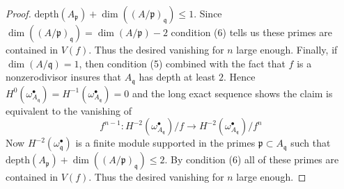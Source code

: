 \begin{proof}
$\text{depth}(A_\mathfrak p) + \dim((A/\mathfrak p)_\mathfrak q) \leq 1$.
Since $\dim((A/\mathfrak p)_\mathfrak q) = \dim(A/\mathfrak p) - 2$
condition (6) tells us these primes are contained in $V(f)$.
Thus the desired vanishing for $n$ large enough.
Finally, if $\dim(A/\mathfrak q) = 1$, then condition (5) combined
with the fact that $f$ is a nonzerodivisor
insures that $A_\mathfrak q$ has depth at least $2$. Hence
$H^0(\omega_{A_\mathfrak q}^\bullet) =
H^{-1}(\omega_{A_\mathfrak q}^\bullet) = 0$
and the long exact sequence shows the claim is
equivalent to the vanishing of
$$
f^{n - 1} :
H^{-2}(\omega_{A_\mathfrak q}^\bullet)/f \to
H^{-2}(\omega_{A_\mathfrak q}^\bullet)/f^n
$$
Now $H^{-2}(\omega^\bullet_\mathfrak q)$ is a finite
module supported in the primes $\mathfrak p \subset A_\mathfrak q$
such that $\text{depth}(A_\mathfrak p) + \dim((A/\mathfrak p)_\mathfrak q)
\leq 2$. By condition (6) all of these primes are contained in $V(f)$.
Thus the desired vanishing for $n$ large enough.
\end{proof}
